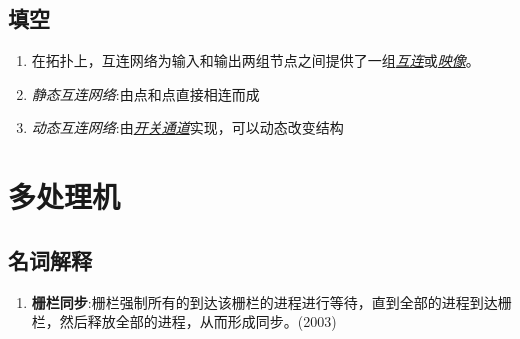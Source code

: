 \documentclass[a4paper]{ctexart}
\begin{document}
\subsection{填空}
\begin{enumerate}
  \item 在拓扑上，互连网络为输入和输出两组节点之间提供了一组\emph{\underline{互连}}或\emph{\underline{映像}}。
  \item \emph{静态互连网络}:由点和点直接相连而成
  \item \emph{动态互连网络}:由\underline{\emph{开关通道}}实现，可以动态改变结构
\end{enumerate}

\section{多处理机}
\subsection{名词解释}
\begin{enumerate}
  \item \textbf{栅栏同步}:栅栏强制所有的到达该栅栏的进程进行等待，直到全部的进程到达栅栏，然后释放全部的进程，从而形成同步。(2003)
  
\end{enumerate}
\end{document}
